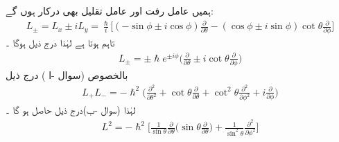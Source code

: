 ہمیں عامل رفت اور عامل تقلیل بھی درکار ہوں گے: 
\begin{align*}
L_{\pm} = L_x \pm i L_y = \frac{\hslash}{i} \big [ (- \sin \phi \pm i \cos \phi) \frac{\partial}{\partial \theta} - (\cos \phi \pm i \sin \phi) \cot \theta \frac{\partial}{\partial \phi} \big ]
\end{align*}
تاہم   ہوتا ہے لہٰذا درج ذیل ہوگا ۔
\begin{align}\label{مساوات_تین_ابعادی_سیڑھی_عاملین}
L_{\pm} = \pm \hslash e^{\pm i \phi} \big ( \frac{\partial}{\partial \theta} \pm i \cot \theta \frac{\partial}{\partial \phi} \big )
\end{align}
بالخصوص (سوال -ا ) درج ذیل 
\begin{align}\label{مساوات_تین_ابعادی_سیڑھی_عاملین_آگے_پیچے}
L_{+} L_{-} = - \hslash^2 \big ( \frac{\partial^2}{\partial \theta^2} + \cot \theta \frac{\partial}{\partial \theta} + \cot^2 \theta \frac{\partial^2}{\partial \phi^2} + i \frac{\partial}{\partial \phi} \big )
\end{align}
لہٰذا  (سوال -ب)درج ذیل حاصل ہو گا ۔
\begin{align}\label{مساوات_تین_ابعادی_مربع_معیار_حرکت}
L^2 = - \hslash^2 \big [ \frac{1}{\sin \theta} \frac{\partial}{\partial \theta} \big ( \sin \theta \frac{\partial}{\partial \theta} \big ) + \frac{1}{\sin^2 \theta} \frac{\partial^2}{\partial \phi^2} \big ]
\end{align}

